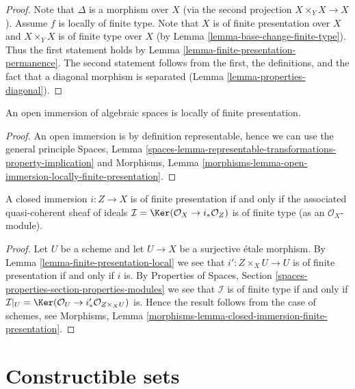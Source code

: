 \begin{proof}
Note that $\Delta$ is a morphism over $X$ (via the second
projection $X \times_Y X \to X$). Assume $f$ is locally of finite type.
Note that $X$ is of finite presentation over $X$ and $X \times_Y X$ is
of finite type over $X$ (by Lemma \ref{lemma-base-change-finite-type}).
Thus the first statement holds by
Lemma \ref{lemma-finite-presentation-permanence}.
The second statement follows from the first, the definitions, and
the fact that a diagonal morphism is separated
(Lemma \ref{lemma-properties-diagonal}).
\end{proof}

\begin{lemma}
\label{lemma-open-immersion-locally-finite-presentation}
An open immersion of algebraic spaces is locally of finite presentation.
\end{lemma}

\begin{proof}
An open immersion is by definition representable, hence we can
use the general principle
Spaces,
Lemma \ref{spaces-lemma-representable-transformations-property-implication}
and
Morphisms,
Lemma \ref{morphisms-lemma-open-immersion-locally-finite-presentation}.
\end{proof}

\begin{lemma}
\label{lemma-closed-immersion-finite-presentation}
A closed immersion $i : Z \to X$ is of finite presentation if and only if
the associated quasi-coherent sheaf of ideals
$\mathcal{I} = \Ker(\mathcal{O}_X \to i_*\mathcal{O}_Z)$
is of finite type (as an $\mathcal{O}_X$-module).
\end{lemma}

\begin{proof}
Let $U$ be a scheme and let $U \to X$ be a surjective \'etale morphism.
By Lemma \ref{lemma-finite-presentation-local}
we see that $i' : Z \times_X U \to U$ is of finite presentation if and
only if $i$ is. By Properties of Spaces, Section
\ref{spaces-properties-section-properties-modules}
we see that $\mathcal{I}$ is of finite type if and only if
$\mathcal{I}|_U = \Ker(\mathcal{O}_U \to i'_*\mathcal{O}_{Z \times_X U})$
is. Hence the result follows from the case of schemes, see Morphisms,
Lemma \ref{morphisms-lemma-closed-immersion-finite-presentation}.
\end{proof}







\section{Constructible sets}
\label{section-constructible}

